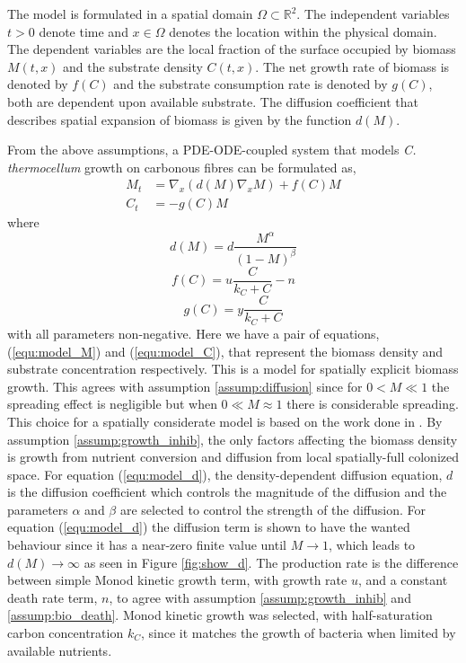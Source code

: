 The model is formulated in a spatial domain $\Omega \subset \mathbb{R}^2$.
The independent variables $t > 0$ denote time and $x \in \Omega$ denotes the location within the physical domain.
The dependent variables are the local fraction of the surface occupied by biomass $M(t,x)$ and the substrate density $C(t,x)$.
The net growth rate of biomass is denoted by $f(C)$ and the substrate consumption rate is denoted by $g(C)$, both are dependent upon available substrate.
The diffusion coefficient that describes spatial expansion of biomass is given by the function $d(M)$.

From the above assumptions, a PDE-ODE-coupled system that models \textit{C. thermocellum} growth on carbonous fibres can be formulated as,
\begin{align} 
   M_t &= \nabla_x \left( d(M) \nabla_x M \right) + f(C) M \label{equ:model_M}\\
   C_t &= -g(C) M \label{equ:model_C}
\end{align}
where
\begin{equation} \label{equ:model_d}
  d(M) = d \frac{M^\alpha}{(1-M)^\beta}
\end{equation}
\begin{equation} \label{equ:model_f}
  f(C) = u \frac{C}{k_C + C} - n 
\end{equation}
\begin{equation} \label{equ:model_g}
  g(C) = y \frac{C}{k_C + C}
\end{equation}
with all parameters non-negative.
Here we have a pair of equations, (\ref{equ:model_M}) and (\ref{equ:model_C}), that represent the biomass density and substrate concentration respectively.
This is a model for spatially explicit biomass growth.
This agrees with assumption \ref{assump:diffusion} since for $0 < M \ll 1$ the spreading effect is negligible but when $0 \ll M \approx 1$ there is considerable spreading.
This choice for a spatially considerate model is based on the work done in \cite{khassehkhan2009nonlinearMaster}.
By assumption \ref{assump:growth_inhib}, the only factors affecting the biomass density is growth from nutrient conversion and diffusion from local spatially-full colonized space.
For equation (\ref{equ:model_d}), the density-dependent diffusion equation, $d$ is the diffusion coefficient which controls the magnitude of the diffusion and the parameters $\alpha$ and $\beta$ are selected to control the strength of the diffusion.
For equation (\ref{equ:model_d}) the diffusion term is shown to have the wanted behaviour since it has a near-zero finite value until $M \to 1$, which leads to $d(M) \to \infty$ as seen in Figure \ref{fig:show_d}. 
The production rate is the difference between simple Monod kinetic growth term, with growth rate $u$, and a constant death rate term, $n$, to agree with assumption \ref{assump:growth_inhib} and \ref{assump:bio_death}.
Monod kinetic growth was selected, with half-saturation carbon concentration $k_C$, since it matches the growth of bacteria when limited by available nutrients. %


